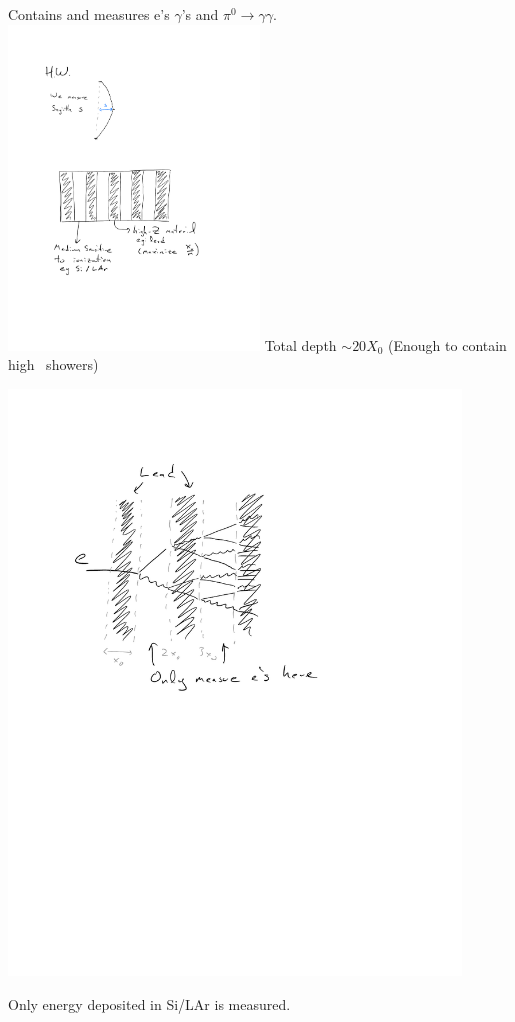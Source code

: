 {Contains and measures e's $\gamma$'s and $\pi^0\rightarrow\gamma\gamma$.
\bc
\includegraphics[width=0.5\textwidth]{./EMCalorimeterNew.pdf}
\ec
Total depth $\sim 20 X_0$ (Enough to contain high \pt\ showers)

\begin{minipage}{0.3\textwidth}
\bc
\includegraphics[width=0.9\textwidth]{./EMReadout.pdf}
\ec
\end{minipage}\hfill
\begin{minipage}{0.7\textwidth}
Only energy deposited in Si/LAr  is measured. 


\end{minipage}}
